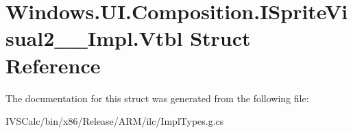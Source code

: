\hypertarget{struct_windows_1_1_u_i_1_1_composition_1_1_i_sprite_visual2_____impl_1_1_vtbl}{}\section{Windows.\+U\+I.\+Composition.\+I\+Sprite\+Visual2\+\_\+\+\_\+\+Impl.\+Vtbl Struct Reference}
\label{struct_windows_1_1_u_i_1_1_composition_1_1_i_sprite_visual2_____impl_1_1_vtbl}


The documentation for this struct was generated from the following file\+:\begin{DoxyCompactItemize}
\item 
I\+V\+S\+Calc/bin/x86/\+Release/\+A\+R\+M/ilc/Impl\+Types.\+g.\+cs\end{DoxyCompactItemize}

